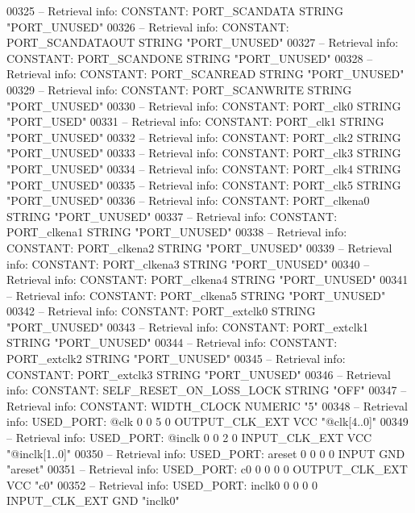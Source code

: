 \begin{DoxyCode}
{00325 \textcolor{keyword}{-- Retrieval info: CONSTANT: PORT\_SCANDATA STRING "PORT\_UNUSED"}
00326 \textcolor{keyword}{-- Retrieval info: CONSTANT: PORT\_SCANDATAOUT STRING "PORT\_UNUSED"}
00327 \textcolor{keyword}{-- Retrieval info: CONSTANT: PORT\_SCANDONE STRING "PORT\_UNUSED"}
00328 \textcolor{keyword}{-- Retrieval info: CONSTANT: PORT\_SCANREAD STRING "PORT\_UNUSED"}
00329 \textcolor{keyword}{-- Retrieval info: CONSTANT: PORT\_SCANWRITE STRING "PORT\_UNUSED"}
00330 \textcolor{keyword}{-- Retrieval info: CONSTANT: PORT\_clk0 STRING "PORT\_USED"}
00331 \textcolor{keyword}{-- Retrieval info: CONSTANT: PORT\_clk1 STRING "PORT\_UNUSED"}
00332 \textcolor{keyword}{-- Retrieval info: CONSTANT: PORT\_clk2 STRING "PORT\_UNUSED"}
00333 \textcolor{keyword}{-- Retrieval info: CONSTANT: PORT\_clk3 STRING "PORT\_UNUSED"}
00334 \textcolor{keyword}{-- Retrieval info: CONSTANT: PORT\_clk4 STRING "PORT\_UNUSED"}
00335 \textcolor{keyword}{-- Retrieval info: CONSTANT: PORT\_clk5 STRING "PORT\_UNUSED"}
00336 \textcolor{keyword}{-- Retrieval info: CONSTANT: PORT\_clkena0 STRING "PORT\_UNUSED"}
00337 \textcolor{keyword}{-- Retrieval info: CONSTANT: PORT\_clkena1 STRING "PORT\_UNUSED"}
00338 \textcolor{keyword}{-- Retrieval info: CONSTANT: PORT\_clkena2 STRING "PORT\_UNUSED"}
00339 \textcolor{keyword}{-- Retrieval info: CONSTANT: PORT\_clkena3 STRING "PORT\_UNUSED"}
00340 \textcolor{keyword}{-- Retrieval info: CONSTANT: PORT\_clkena4 STRING "PORT\_UNUSED"}
00341 \textcolor{keyword}{-- Retrieval info: CONSTANT: PORT\_clkena5 STRING "PORT\_UNUSED"}
00342 \textcolor{keyword}{-- Retrieval info: CONSTANT: PORT\_extclk0 STRING "PORT\_UNUSED"}
00343 \textcolor{keyword}{-- Retrieval info: CONSTANT: PORT\_extclk1 STRING "PORT\_UNUSED"}
00344 \textcolor{keyword}{-- Retrieval info: CONSTANT: PORT\_extclk2 STRING "PORT\_UNUSED"}
00345 \textcolor{keyword}{-- Retrieval info: CONSTANT: PORT\_extclk3 STRING "PORT\_UNUSED"}
00346 \textcolor{keyword}{-- Retrieval info: CONSTANT: SELF\_RESET\_ON\_LOSS\_LOCK STRING "OFF"}
00347 \textcolor{keyword}{-- Retrieval info: CONSTANT: WIDTH\_CLOCK NUMERIC "5"}
00348 \textcolor{keyword}{-- Retrieval info: USED\_PORT: @clk 0 0 5 0 OUTPUT\_CLK\_EXT VCC "@clk[4..0]"}
00349 \textcolor{keyword}{-- Retrieval info: USED\_PORT: @inclk 0 0 2 0 INPUT\_CLK\_EXT VCC "@inclk[1..0]"}
00350 \textcolor{keyword}{-- Retrieval info: USED\_PORT: areset 0 0 0 0 INPUT GND "areset"}
00351 \textcolor{keyword}{-- Retrieval info: USED\_PORT: c0 0 0 0 0 OUTPUT\_CLK\_EXT VCC "c0"}
00352 \textcolor{keyword}{-- Retrieval info: USED\_PORT: inclk0 0 0 0 0 INPUT\_CLK\_EXT GND "inclk0"}
}
\end{DoxyCode}
